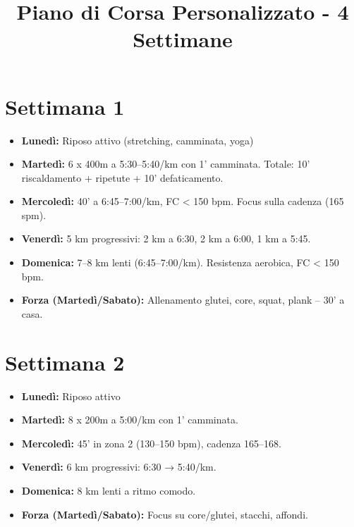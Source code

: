 \documentclass[a4paper, 11pt]{article}
\title{\textbf{Piano di Corsa Personalizzato - 4 Settimane}}
\author{} %
\date{} %
\begin{document}
\pagestyle{empty} %
\maketitle
\begin{center}
    \vspace{-1.5cm} %
\end{center}

\noindent %
\begin{minipage}[t]{0.48\textwidth} %
\section*{Settimana 1}
\begin{itemize}[leftmargin=*, labelsep=5.8mm, topsep=0pt, partopsep=0pt, itemsep=2pt, parsep=2pt]
    \item \textbf{Lunedì:} Riposo attivo (stretching, camminata, yoga)
    \item \textbf{Martedì:} 6 x 400m a 5:30–5:40/km con 1’ camminata. Totale: 10' riscaldamento + ripetute + 10' defaticamento.
    \item \textbf{Mercoledì:} 40’ a 6:45–7:00/km, FC < 150 bpm. Focus sulla cadenza (165 spm).
    \item \textbf{Venerdì:} 5 km progressivi: 2 km a 6:30, 2 km a 6:00, 1 km a 5:45.
    \item \textbf{Domenica:} 7–8 km lenti (6:45–7:00/km). Resistenza aerobica, FC < 150 bpm.
    \item \textbf{Forza (Martedì/Sabato):} Allenamento glutei, core, squat, plank – 30’ a casa.
\end{itemize}
\end{minipage}\hfill %
\begin{minipage}[t]{0.48\textwidth} %
\section*{Settimana 2}
\begin{itemize}[leftmargin=*, labelsep=5.8mm, topsep=0pt, partopsep=0pt, itemsep=2pt, parsep=2pt]
    \item \textbf{Lunedì:} Riposo attivo
    \item \textbf{Martedì:} 8 x 200m a 5:00/km con 1’ camminata.
    \item \textbf{Mercoledì:} 45’ in zona 2 (130–150 bpm), cadenza 165–168.
    \item \textbf{Venerdì:} 6 km progressivi: 6:30 → 5:40/km.
    \item \textbf{Domenica:} 8 km lenti a ritmo comodo.
    \item \textbf{Forza (Martedì/Sabato):} Focus su core/glutei, stacchi, affondi.
\end{itemize}
\end{minipage}
\end{document}
